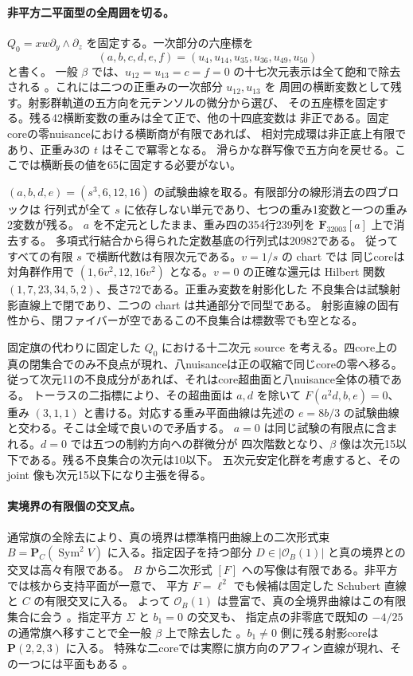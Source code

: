 \documentclass[11pt,a4paper]{ltjsarticle}
\theoremstyle{remark}
\begin{document}
\paragraph{非平方二平面型の全周囲を切る。}
$Q_0=xw\partial_y\wedge\partial_z$ を固定する。一次部分の六座標を
\[
(a,b,c,d,e,f)=(u_4,u_{14},u_{35},u_{36},u_{49},u_{50})
\]
と書く。
一般 $\beta$ では、$u_{12}=u_{13}=c=f=0$ の十七次元表示は全て飽和で除去される
\cite{zero-pair-v59,zero-pair-review-v60}。これには二つの正重みの一次部分 $u_{12},u_{13}$ を
周囲の横断変数として残す。射影群軌道の五方向を元テンソルの微分から選び、
その五座標を固定する。残る42横断変数の重みは全て正で、他の十四底変数は
非正である。固定coreの零nuisanceにおける横断商が有限であれば、
相対完成環は非正底上有限であり、正重み3の $t$ はそこで冪零となる。
滑らかな群写像で五方向を戻せる。ここでは横断長の値を65に固定する必要がない。

$(a,b,d,e)=(s^3,6,12,16)$ の試験曲線を取る。有限部分の線形消去の四ブロックは
行列式が全て $s$ に依存しない単元であり、七つの重み1変数と一つの重み2変数が残る。
$a$ を不定元としたまま、重み四の354行239列を $\mathbf F_{32003}[a]$ 上で消去する。
多項式行結合から得られた定数基底の行列式は20982である。
従ってすべての有限 $s$ で横断代数は有限次元である。$v=1/s$ の chart では
同じcoreは対角群作用で $(1,6v^2,12,16v^2)$ となる。$v=0$ の正確な還元は
Hilbert 関数 $(1,7,23,34,5,2)$、長さ72である。正重み変数を射影化した
不良集合は試験射影直線上で閉であり、二つの chart は共通部分で同型である。
射影直線の固有性から、閉ファイバーが空であるこの不良集合は標数零でも空となる。

固定旗の代わりに固定した $Q_0$ における十二次元 source を考える。四core上の
真の閉集合でのみ不良点が現れ、八nuisanceは正の収縮で同じcoreの零へ移る。
従って次元11の不良成分があれば、それはcore超曲面と八nuisance全体の積である。
トーラスの二指標により、その超曲面は $a,d$ を除いて
$F(a^2d,b,e)=0$、重み $(3,1,1)$ と書ける。対応する重み平面曲線は先述の
$e=8b/3$ の試験曲線と交わる。そこは全域で良いので矛盾する。
$a=0$ は同じ試験の有限点に含まれる。$d=0$ では五つの制約方向への群微分が
四次階数となり、$\beta$ 像は次元15以下である。残る不良集合の次元は10以下。
五次元安定化群を考慮すると、その joint 像も次元15以下になり主張を得る。

\paragraph{実境界の有限個の交叉点。}
通常旗の全除去により、真の境界は標準楕円曲線上の二次形式束
$B=\mathbf P_C(\operatorname{Sym}^2 V)$ に入る。指定因子を持つ部分
$D\in|\mathcal O_B(1)|$ と真の境界との交叉は高々有限である。
$B$ から二次形式 $[F]$ への写像は有限である。非平方では核から支持平面が一意で、
平方 $F=\ell^2$ でも候補は固定した Schubert 直線と $C$ の有限交叉に入る。
よって $\mathcal O_B(1)$ は豊富で、真の全境界曲線はこの有限集合に会う
\cite{anchor-finite-v59}。指定平方 $\Sigma$ と $b_1=0$ の交叉も、
指定点の非零底で既知の $-4/25$ の通常旗へ移すことで全一般 $\beta$ 上で除去した
\cite{sigma-meet-v59}。$b_1\ne0$ 側に残る射影coreは $\mathbf P(2,2,3)$ に入る。
特殊な二coreでは実際に旗方向のアフィン直線が現れ、その一つには平面もある
\cite{sigma-core-v59,sigma-line-v59}。
\end{document}
